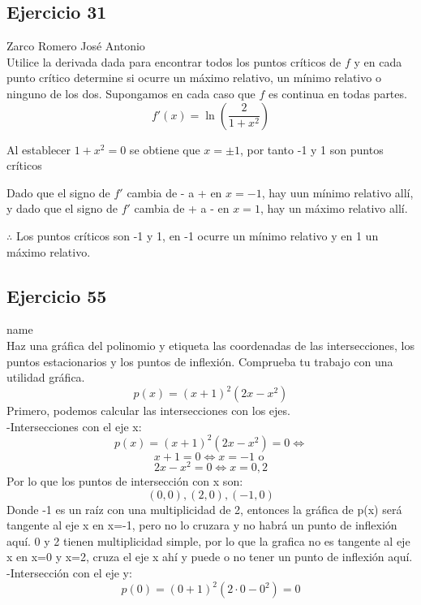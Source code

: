 \documentclass[12pt]{article}
\begin{document}
\subsection{Ejercicio 31} Zarco Romero José Antonio \\

Utilice la derivada dada para encontrar todos los puntos críticos de $f$ y en cada punto crítico determine si ocurre un máximo relativo, un mínimo relativo o ninguno de los dos. Supongamos en cada caso que $f$ es continua en todas partes.
\[
f'(x)=\ln{\left( \frac{2}{1+x^2} \right)}
\]

Al establecer $1+x^2=0$ se obtiene que $x=\pm 1$, por tanto -1 y 1 son puntos críticos
  \begin{table}[H]
    \centering
    \begin{tabular}{c|c|c}
      \hline
      Intervalo & $f'(x) = \ln{\left( \frac{2}{1+x^2} \right)$ & Conclusión \\
      \hline
      $(-\infty,-1)$ & - & $f$ es decreciente \\
      $(-1,1)$ & + & $f$ es creciente\\
      $(1,+\infty)$ & - & $f$ es decreciente\\
      \hline
    \end{tabular}
  \end{table}
  Dado que el signo de $f'$ cambia de - a + en $x=-1$, hay uun mínimo relativo allí, y
  dado que el signo de $f'$ cambia de + a - en $x=1$, hay un máximo relativo allí.

  $\therefore $ Los puntos críticos son -1 y 1, en -1 ocurre un mínimo relativo y en 1 un máximo relativo.

\subsection{Ejercicio 55} name \\

Haz una gráfica del polinomio y etiqueta las coordenadas de las intersecciones, los puntos estacionarios y los puntos de inflexión. Comprueba tu trabajo con una utilidad gráfica.
\[
p(x) = (x + 1)^2 (2x-x^2 )
\]
Primero, podemos calcular las intersecciones con los ejes. \\
-Intersecciones con el eje x:
\[
p(x) = (x + 1)^2 (2x-x^2 ) = 0 \iff 
\]
\[
x+1 = 0 \iff  x = -1 \text{ o } 
 \]
 \[
 2x-x^{2}=0 \iff x = 0, 2
 \]
 Por lo que los puntos de intersección con x son:
 \[
(0,0), (2,0), (-1, 0)
 \]
 Donde -1 es un raíz con una multiplicidad de 2, entonces la gráfica de p(x) será tangente al eje x en x=-1, pero no lo cruzara y no habrá un punto de inflexión aquí. 0 y 2 tienen multiplicidad simple, por lo que la grafica no es tangente al eje x en x=0 y x=2, cruza el eje x ahí y puede o no tener un punto de inflexión aquí.\\
 -Intersección con el eje y:\\
 \[
 p(0) = (0 + 1)^2 (2\cdot0-0^2) = 0
 \]
 
\end{document}
